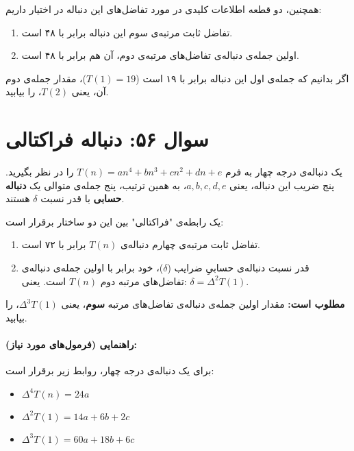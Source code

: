 \documentclass[12pt]{article}
\begin{document}
	همچنین، دو قطعه اطلاعات کلیدی در مورد تفاضل‌های این دنباله در اختیار داریم:
	\begin{enumerate}[label=(\roman*)]
		\item تفاضل ثابت مرتبه‌ی سوم این دنباله برابر با ۴۸ است.
		\item اولین جمله‌ی دنباله‌ی تفاضل‌های مرتبه‌ی دوم، آن هم برابر با ۴۸ است.
	\end{enumerate}
	\vspace{0.5cm}
	
	اگر بدانیم که جمله‌ی اول این دنباله برابر با ۱۹ است (\(T(1) = 19\))، مقدار جمله‌ی دوم آن، یعنی \(T(2)\)، را بیابید.
	
	\vspace{1cm}
	\hrulefill
	\vspace{1cm}
	
	\section*{سوال ۵۶: دنباله فراکتالی }
	یک دنباله‌ی درجه چهار به فرم \( T(n) = an^4 + bn^3 + cn^2 + dn + e \) را در نظر بگیرید.
	پنج ضریب این دنباله، یعنی \(a, b, c, d, e\)، به همین ترتیب، پنج جمله‌ی متوالی یک \textbf{دنباله حسابی} با قدر نسبت \(\delta\) هستند.
	\vspace{0.5cm}
	
	یک رابطه‌ی "فراکتالی"  بین این دو ساختار برقرار است:
	\begin{enumerate}[label=(\roman*)]
		\item تفاضل ثابت مرتبه‌ی چهارم دنباله‌ی \(T(n)\) برابر با ۷۲ است.
		\item قدر نسبت دنباله‌ی حسابیِ ضرایب (\(\delta\))، خود برابر با اولین جمله‌ی دنباله‌ی تفاضل‌های مرتبه دوم \(T(n)\) است. یعنی: \( \delta = \Delta^2T(1) \).
	\end{enumerate}
	\vspace{0.5cm}
	
	\textbf{مطلوب است:} مقدار اولین جمله‌ی دنباله‌ی تفاضل‌های مرتبه \textbf{سوم}، یعنی \( \Delta^3T(1) \)، را بیابید.
	\vspace{1cm}
	
	\paragraph{راهنمایی (فرمول‌های مورد نیاز):}
	برای یک دنباله‌ی درجه چهار، روابط زیر برقرار است:
	\begin{itemize}
		\item \( \Delta^4T(n) = 24a \)
		\item \( \Delta^2T(1) = 14a + 6b + 2c \)
		\item \( \Delta^3T(1) = 60a + 18b + 6c \)
	\end{itemize}
	
\end{document}
